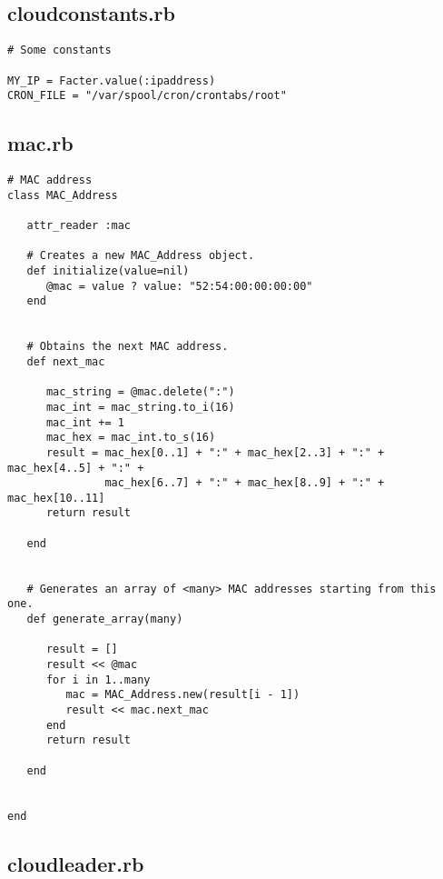 \subsection{cloudconstants.rb}


\begin{lstlisting}
# Some constants

MY_IP = Facter.value(:ipaddress)
CRON_FILE = "/var/spool/cron/crontabs/root"
\end{lstlisting}


\subsection{mac.rb}


\begin{lstlisting}
# MAC address
class MAC_Address
   
   attr_reader :mac
   
   # Creates a new MAC_Address object.
   def initialize(value=nil)
      @mac = value ? value: "52:54:00:00:00:00"
   end
   
   
   # Obtains the next MAC address.
   def next_mac
   
      mac_string = @mac.delete(":")
      mac_int = mac_string.to_i(16)
      mac_int += 1
      mac_hex = mac_int.to_s(16)
      result = mac_hex[0..1] + ":" + mac_hex[2..3] + ":" + mac_hex[4..5] + ":" + 
               mac_hex[6..7] + ":" + mac_hex[8..9] + ":" + mac_hex[10..11]
      return result
      
   end
   
   
   # Generates an array of <many> MAC addresses starting from this one.
   def generate_array(many)
   
      result = []
      result << @mac
      for i in 1..many
         mac = MAC_Address.new(result[i - 1])
         result << mac.next_mac
      end
      return result
   
   end
   
   
end
\end{lstlisting}


\subsection{cloudleader.rb}


